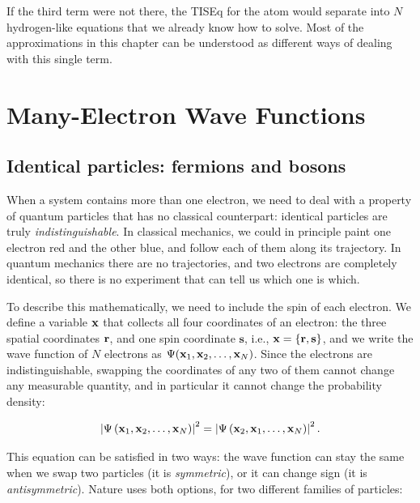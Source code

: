 \documentclass[
  english,
  9pt,
]{extbook}
\theoremstyle{definition}
\theoremstyle{definition}
\theoremstyle{definition}
\theoremstyle{definition}
\theoremstyle{remark}
\begin{document}
If the third term were not there, the TISEq for the atom would separate into \(N\) hydrogen-like equations that we already know how to solve. Most of the approximations in this chapter can be understood as different ways of dealing with this single term.

\section{Many-Electron Wave Functions}\label{many-electron-wave-functions}

\subsection{Identical particles: fermions and bosons}\label{identical-particles-fermions-and-bosons}

When a system contains more than one electron, we need to deal with a property of quantum particles that has no classical counterpart: identical particles are truly \emph{indistinguishable}. In classical mechanics, we could in principle paint one electron red and the other blue, and follow each of them along its trajectory. In quantum mechanics there are no trajectories, and two electrons are completely identical, so there is no experiment that can tell us which one is which.

To describe this mathematically, we need to include the spin of each electron. We define a variable \({\bf x}\) that collects all four coordinates of an electron: the three spatial coordinates \({\bf r}\), and one spin coordinate \(\mathbf{s}\), i.e., \({\bf x} = \{ {\bf r}, {\bf s} \}\), and we write the wave function of \(N\) electrons as \(\Psi({\bf x}_1, {\bf x}_2, \ldots, {\bf x}_N)\). Since the electrons are indistinguishable, swapping the coordinates of any two of them cannot change any measurable quantity, and in particular it cannot change the probability density:

\begin{equation}
\left|\Psi\left({\bf x}_1,{\bf x}_2,\ldots, {\bf x}_N\right)\right|^2=\left|\Psi\left({\bf x}_2,{\bf x}_1,\ldots, {\bf x}_N\right)\right|^2.
\label{eq:identical1}
\end{equation}

This equation can be satisfied in two ways: the wave function can stay the same when we swap two particles (it is \emph{symmetric}), or it can change sign (it is \emph{antisymmetric}). Nature uses both options, for two different families of particles:
\end{document}
